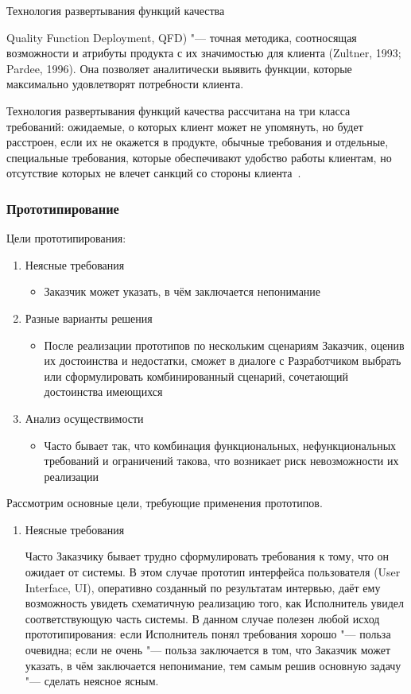\documentclass{../industrial-development}
\begin{document}
Технология развертывания функций качества {Quality Function Deployment, QFD) "--- точная методика, соотносящая возможности и атрибуты продукта с их значимостью для клиента (Zultner, 1993; Pardee, 1996). Она позволяет аналитически выявить функции, которые максимально удовлетворят потребности клиента.

Технология развертывания функций качества рассчитана на три класса требований: ожидаемые, о которых клиент может не упомянуть, но будет расстроен, если их не окажется в продукте, обычные требования и отдельные, специальные требования, которые обеспечивают удобство работы клиентам, но отсутствие которых не влечет санкций со стороны клиента~\cite[с.~49--50]{Wiegers}.


\begin{frame} \frametitle {Прототипирование}
Цели прототипирования:
\begin{enumerate}
\item Неясные требования
\begin{itemize}
\item Заказчик может указать, в чём заключается непонимание
\end{itemize}

\item Разные варианты решения
\begin{itemize}
\item После реализации прототипов по нескольким сценариям Заказчик, оценив их достоинства и недостатки, сможет в диалоге с Разработчиком выбрать или сформулировать комбинированный сценарий, сочетающий достоинства имеющихся
\end{itemize}
\item Анализ осуществимости
\begin{itemize}
\item Часто бывает так, что комбинация функциональных, нефункциональных требований и ограничений такова, что возникает риск невозможности их реализации
\end{itemize}
\end{enumerate}

\end{frame}

\lecturenotes

Рассмотрим основные цели, требующие применения прототипов.
\begin{enumerate}
\item \alert{Неясные требования}

Часто Заказчику бывает трудно сформулировать требования к тому, что он ожидает от системы. В этом случае прототип интерфейса
пользователя (User Interface, UI), оперативно созданный по результатам интервью, даёт ему возможность увидеть схематичную реализацию того, как Исполнитель увидел соответствующую часть системы. В данном случае полезен любой исход прототипирования: если Исполнитель понял требования хорошо "--- польза очевидна; если не очень "--- польза заключается в том, что Заказчик может указать, в чём заключается непонимание, тем самым решив основную задачу "--- сделать неясное ясным.


\end{enumerate}}
\end{document}
